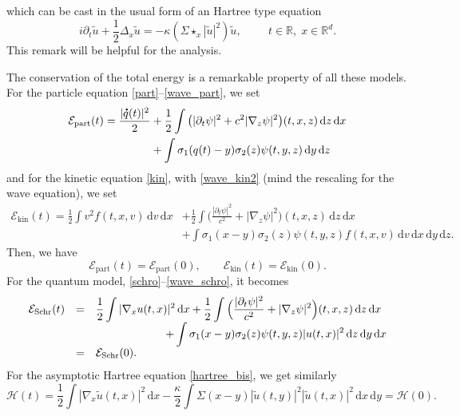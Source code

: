 \documentclass[JEP,XML,SOM,NoEqCountersInSection,NoFloatCountersInSection,Unicode,published]{cedram}
\let\tilde\oldtilde
\theoremstyle{definition}
\newcommand*{\overbigdot}[1]{%
\accentset{\mbox{\large\bfseries .}}{#1}}
\let\tilde\widetilde
\newcommand{\R}{\mathbb{R}}
\let\ds\displaystyle
\newcommand{\ud}{\, {\mathrm{d}}}
\begin{document}
which can be cast in the usual form of an Hartree type equation
\begin{equation}\label{hartree_bis}
i\partial_{t}\tilde u+\frac{1}{2}\Delta_{x}\tilde u=-\kappa\left(\Sigma\star_{x}|\tilde u|^{2}\right)\tilde u,\hspace{1cm}t\in\R,\;x\in\R^{d}.
\end{equation}
This remark will be helpful for the analysis.

The conservation of the total
energy
is a remarkable property of all these models.
For the particle equation \eqref{part}--\eqref{wave_part}, we set
\begin{align*}
\mathcal E_{\mathrm{part}}(t)=\ds\frac{|\overbigdot q(t)|^2}{2} &+\frac12\ds\int \big(
|\partial_t \psi | ^ 2+ c^2 |\nabla_z \psi|^2\big) (t,x,z) \ud z\ud x
\\
&+\int \sigma_1( q(t)-y)\sigma_2(z)\psi(t,y,z)\ud y \ud z
\end{align*}
and for the kinetic equation \eqref{kin}, with \eqref{wave_kin2}
(mind the rescaling for the wave equation), we set
\begin{align*}
\mathcal E_{\mathrm{kin}}(t)
=\frac{1}{2} \ds\int v^2 f(t,x,v)\ud v \ud x&+\frac{1}{2}\ds\int \Big(\frac{|\partial_t \psi | ^ 2}{c^2}+ |\nabla_z \psi|^2\Big) (t,x,z) \ud z\ud x
\\
&+\int \sigma_1( x-y)\sigma_2(z)\psi(t,y,z)f(t,x,v) \ud v \ud x \ud y \ud z.
\end{align*}
Then, we have
\[
\mathcal E_{\mathrm{part}}(t)=\mathcal E_{\mathrm{part}}(0),\qquad
\mathcal E_{\mathrm{kin}}(t)=\mathcal E_{\mathrm{kin}}(0).
\]
For the quantum model, \eqref{schro}--\eqref{wave_schro}, it becomes
\begin{equation}\label{energy_Sch}
\begin{array}{lll}
\mathcal E_{\mathrm {Schr}}(t)&=&
\ds\frac{1}{2}
\ds\int |\nabla_{x}u(t,x)|^2 \ud x+
\ds\frac{1}{2}\ds\int \Big(
\ds\frac{|\partial_t \psi | ^ 2}{c^2}+ |\nabla_z \psi|^2\Big) (t,x,z) \ud z\ud x
\\&&\hspace*{2.2cm} +
\ds \int
\sigma_{1} (x-y) \sigma_{2}(z)\psi(t,y,z) |u(t,x) |^{2}\ud z\ud y\ud x
\\&=&\mathcal E_{\mathrm {Schr}}(0).
\end{array}
\end{equation}
For
the asymptotic Hartree equation \eqref{hartree_bis}, we get
similarly
\begin{equation}\label{energy_Har}
\mathcal H(t)=\frac{1}{2}\ds\int |\nabla_{x}\tilde u(t,x)|^2 \ud x
-\frac{\kappa}{2}\ds\int \Sigma(x-y) |\tilde u(t,y) |^{2}|\tilde u(t,x) |^{2}\ud x\ud y
=\mathcal H(0).
\end{equation}
\end{document}
